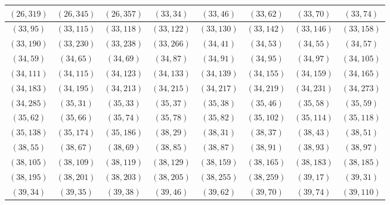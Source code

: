 \documentclass[11pt,reqno]{amsart}
\theoremstyle{definition}
\begin{document}
\begin{longtable}{|c|c|c|c|c|c|c|c|}
$ ( 26 , 319 )$
 & 
$ ( 26 , 345 )$
 & 
$ ( 26 , 357 )$
 & 
$ ( 33 , 34 )$
 & 
$ ( 33 , 46 )$
 & 
$ ( 33 , 62 )$
 & 
$ ( 33 , 70 )$
 & 
$ ( 33 , 74 )$
\\ \hline
$ ( 33 , 95 )$
 & 
$ ( 33 , 115 )$
 & 
$ ( 33 , 118 )$
 & 
$ ( 33 , 122 )$
 & 
$ ( 33 , 130 )$
 & 
$ ( 33 , 142 )$
 & 
$ ( 33 , 146 )$
 & 
$ ( 33 , 158 )$
\\ \hline
$ ( 33 , 190 )$
 & 
$ ( 33 , 230 )$
 & 
$ ( 33 , 238 )$
 & 
$ ( 33 , 266 )$
 & 
$ ( 34 , 41 )$
 & 
$ ( 34 , 53 )$
 & 
$ ( 34 , 55 )$
 & 
$ ( 34 , 57 )$
\\ \hline
$ ( 34 , 59 )$
 & 
$ ( 34 , 65 )$
 & 
$ ( 34 , 69 )$
 & 
$ ( 34 , 87 )$
 & 
$ ( 34 , 91 )$
 & 
$ ( 34 , 95 )$
 & 
$ ( 34 , 97 )$
 & 
$ ( 34 , 105 )$
\\ \hline
$ ( 34 , 111 )$
 & 
$ ( 34 , 115 )$
 & 
$ ( 34 , 123 )$
 & 
$ ( 34 , 133 )$
 & 
$ ( 34 , 139 )$
 & 
$ ( 34 , 155 )$
 & 
$ ( 34 , 159 )$
 & 
$ ( 34 , 165 )$
\\ \hline
$ ( 34 , 183 )$
 & 
$ ( 34 , 195 )$
 & 
$ ( 34 , 213 )$
 & 
$ ( 34 , 215 )$
 & 
$ ( 34 , 217 )$
 & 
$ ( 34 , 219 )$
 & 
$ ( 34 , 231 )$
 & 
$ ( 34 , 273 )$
\\ \hline
$ ( 34 , 285 )$
 & 
$ ( 35 , 31 )$
 & 
$ ( 35 , 33 )$
 & 
$ ( 35 , 37 )$
 & 
$ ( 35 , 38 )$
 & 
$ ( 35 , 46 )$
 & 
$ ( 35 , 58 )$
 & 
$ ( 35 , 59 )$
\\ \hline
$ ( 35 , 62 )$
 & 
$ ( 35 , 66 )$
 & 
$ ( 35 , 74 )$
 & 
$ ( 35 , 78 )$
 & 
$ ( 35 , 82 )$
 & 
$ ( 35 , 102 )$
 & 
$ ( 35 , 114 )$
 & 
$ ( 35 , 118 )$
\\ \hline
$ ( 35 , 138 )$
 & 
$ ( 35 , 174 )$
 & 
$ ( 35 , 186 )$
 & 
$ ( 38 , 29 )$
 & 
$ ( 38 , 31 )$
 & 
$ ( 38 , 37 )$
 & 
$ ( 38 , 43 )$
 & 
$ ( 38 , 51 )$
\\ \hline
$ ( 38 , 55 )$
 & 
$ ( 38 , 67 )$
 & 
$ ( 38 , 69 )$
 & 
$ ( 38 , 85 )$
 & 
$ ( 38 , 87 )$
 & 
$ ( 38 , 91 )$
 & 
$ ( 38 , 93 )$
 & 
$ ( 38 , 97 )$
\\ \hline
$ ( 38 , 105 )$
 & 
$ ( 38 , 109 )$
 & 
$ ( 38 , 119 )$
 & 
$ ( 38 , 129 )$
 & 
$ ( 38 , 159 )$
 & 
$ ( 38 , 165 )$
 & 
$ ( 38 , 183 )$
 & 
$ ( 38 , 185 )$
\\ \hline
$ ( 38 , 195 )$
 & 
$ ( 38 , 201 )$
 & 
$ ( 38 , 203 )$
 & 
$ ( 38 , 205 )$
 & 
$ ( 38 , 255 )$
 & 
$ ( 38 , 259 )$
 & 
$ ( 39 , 17 )$
 & 
$ ( 39 , 31 )$
\\ \hline
$ ( 39 , 34 )$
 & 
$ ( 39 , 35 )$
 & 
$ ( 39 , 38 )$
 & 
$ ( 39 , 46 )$
 & 
$ ( 39 , 62 )$
 & 
$ ( 39 , 70 )$
 & 
$ ( 39 , 74 )$
 & 
$ ( 39 , 110 )$
\\ \hline

\end{longtable}
\end{document}
